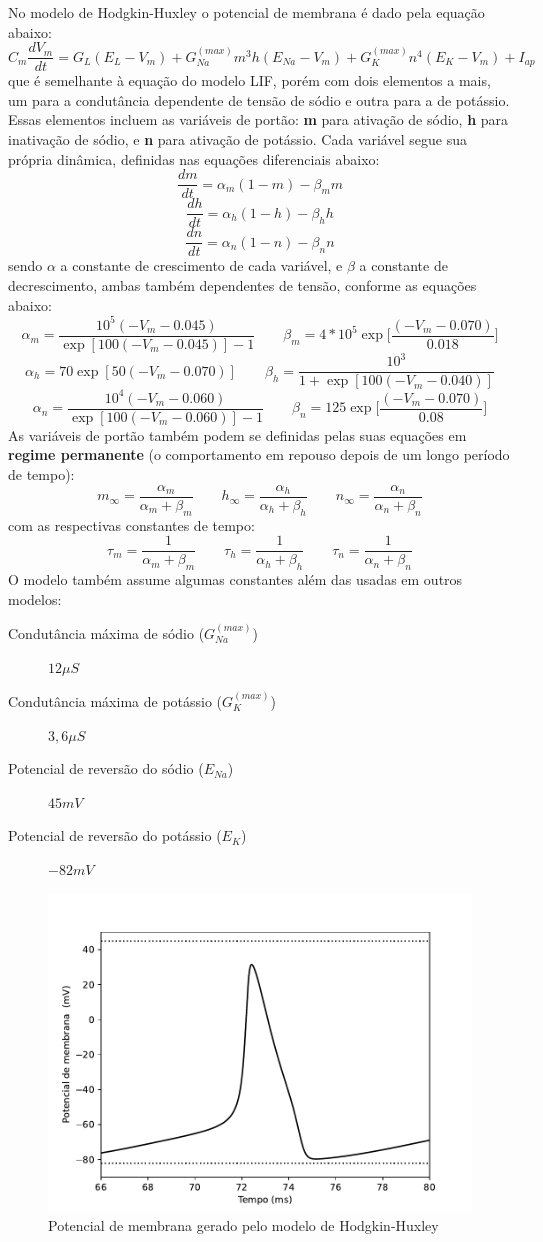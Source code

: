No modelo de Hodgkin-Huxley o potencial de membrana é dado pela equação abaixo:
$$
C_m\frac{dV_m}{dt}=G_L(E_L-V_m)+G_{Na}^{(max)}m^3h(E_{Na}-V_m)+G_K^{(max)}n^4(E_K-V_m)+I_{ap}
$$
que é semelhante à equação do modelo LIF, porém com dois elementos a mais, um para a condutância dependente de tensão de sódio e outra para a de potássio. Essas elementos incluem as variáveis de portão: \textbf{m} para ativação de sódio, \textbf{h} para inativação de sódio, e \textbf{n} para ativação de potássio. Cada variável segue sua própria dinâmica, definidas nas equações diferenciais abaixo:
$$
\frac{dm}{dt}=\alpha_m(1-m)-\beta_mm
$$$$
\frac{dh}{dt}=\alpha_h(1-h)-\beta_hh
$$$$
\frac{dn}{dt}=\alpha_n(1-n)-\beta_nn
$$
sendo $\alpha$ a constante de crescimento de cada variável, e $\beta$ a constante de decrescimento, ambas também dependentes de tensão, conforme as equações abaixo:
$$
\alpha_m=\frac{10^5(-V_m-0.045)}{\exp[100(-V_m-0.045)]-1}
\qquad
\beta_m=4*10^5\exp\Big[\frac{(-V_m-0.070)}{0.018}\Big]
$$$$
\alpha_h=70\exp[50(-V_m-0.070)]
\qquad
\beta_h=\frac{10^3}{1+\exp[100(-V_m-0.040)]}
$$$$
\alpha_n=\frac{10^4(-V_m-0.060)}{\exp[100(-V_m-0.060)]-1}
\qquad
\beta_n=125\exp\Big[\frac{(-V_m-0.070)}{0.08}\Big]
$$
As variáveis de portão também podem se definidas pelas suas equações em \textbf{regime permanente} (o comportamento em repouso depois de um longo período de tempo): \nocite{ermentrout_mathematical_2010}
$$
m_\infty=\frac{\alpha_m}{\alpha_m+\beta_m}
\qquad
h_\infty=\frac{\alpha_h}{\alpha_h+\beta_h}
\qquad
n_\infty=\frac{\alpha_n}{\alpha_n+\beta_n}
$$
com as respectivas constantes de tempo:
$$
\tau_m=\frac{1}{\alpha_m+\beta_m}
\qquad
\tau_h=\frac{1}{\alpha_h+\beta_h}
\qquad
\tau_n=\frac{1}{\alpha_n+\beta_n}
$$
O modelo também assume algumas constantes além das usadas em outros modelos:
\begin{description}
	\item[Condutância máxima de sódio ($G_{Na}^{(max)}$)] $12\mu S$
	\item[Condutância máxima de potássio ($G_K^{(max)}$)] $3,6\mu S$
	\item[Potencial de reversão do sódio ($E_{Na}$)] $45mV$
	\item[Potencial de reversão do potássio ($E_K$)] $-82mV$
\end{description}

\begin{figure}[h!]
	\centering
	\caption{Potencial de membrana gerado pelo modelo de Hodgkin-Huxley}
	\label{fig:hhvm}
	\includegraphics[width=0.7\linewidth]{figs/hh_vm}
\end{figure}

